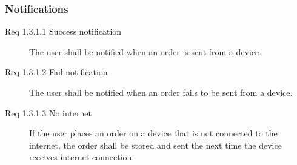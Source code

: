 \documentclass[10pt,a4paper]{article}
\begin{document}
\subsubsection{Notifications}
\begin{description}

\item [Req 1.3.1.1 Success notification] The user shall be notified when an order is sent from a device.
\item [Req 1.3.1.2 Fail notification] The user shall be notified when an order fails to be sent from a device.

\item [Req 1.3.1.3 No internet] If the user places an order on a device that is not connected to the internet, the order shall be stored and sent the next time the device receives internet connection. 
\end{description}
\end{document}

